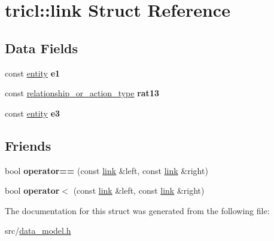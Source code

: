 \hypertarget{structtricl_1_1link}{}\section{tricl\+:\+:link Struct Reference}
\label{structtricl_1_1link}
\subsection*{Data Fields}
\begin{DoxyCompactItemize}
\item 
\mbox{\label{structtricl_1_1link_a94b71567d0a342c8d0bf28e4fea1dff4}} 
const \hyperlink{data__model_8h_a57273122278e8b301844e2a2e1f0742f}{entity} {\bfseries e1}
\item 
\mbox{\label{structtricl_1_1link_a9a21745032378ca68f88966d78814be0}} 
const \hyperlink{data__model_8h_a2d01894944fb58a8fedc0912a48d13f8}{relationship\+\_\+or\+\_\+action\+\_\+type} {\bfseries rat13}
\item 
\mbox{\label{structtricl_1_1link_ad54f7dbfcda5fd3f98ff5db897893c87}} 
const \hyperlink{data__model_8h_a57273122278e8b301844e2a2e1f0742f}{entity} {\bfseries e3}
\end{DoxyCompactItemize}
\subsection*{Friends}
\begin{DoxyCompactItemize}
\item 
\mbox{\label{structtricl_1_1link_a383e61e15072ef3fe9e16102dea483e0}} 
bool {\bfseries operator==} (const \hyperlink{structtricl_1_1link}{link} \&left, const \hyperlink{structtricl_1_1link}{link} \&right)
\item 
\mbox{\label{structtricl_1_1link_af79bc13140c8180154526642748b0c33}} 
bool {\bfseries operator$<$} (const \hyperlink{structtricl_1_1link}{link} \&left, const \hyperlink{structtricl_1_1link}{link} \&right)
\end{DoxyCompactItemize}


The documentation for this struct was generated from the following file\+:\begin{DoxyCompactItemize}
\item 
src/\hyperlink{data__model_8h}{data\+\_\+model.\+h}\end{DoxyCompactItemize}
